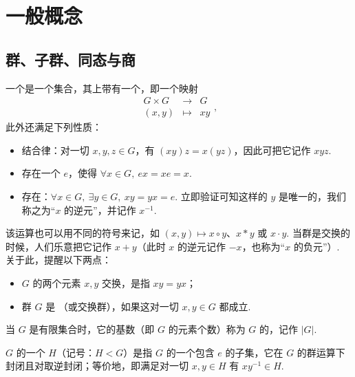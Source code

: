 \chapter{一般概念}\label{chap:fg-1}
\section{群、子群、同态与商}\label{sec:fg-1-1}

\begin{definition}\label{def:fg-1-1-1}
一个是一个集合，其上带有一个，即一个映射
\[
\begin{array}{rcl}
G\times G & \longrightarrow & G\\
(x,y) & \longmapsto & xy
\end{array},
\]
此外还满足下列性质：
\begin{itemize}[label=--]
\item 结合律：对一切 $x,y,z\in G$，有 $(xy)z=x(yz)$，因此可把它记作 $xyz$.
\item 存在一个 $e$，使得 $\forall x\in G,\ ex=xe=x$.
\item 存在：$\forall x\in G,\ \exists y\in G,\ xy=yx=e$. 立即验证可知这样的 $y$ 是唯一的，我们称之为``$x$ 的逆元''，并记作 $x^{-1}$.
\end{itemize}

该运算也可以用不同的符号来记，如 $(x,y)\mapsto x\circ y$、$x*y$ 或 $x\cdot y$. 当群是交换的时候，人们乐意把它记作 $x+y$（此时 $x$ 的逆元记作 $-x$，也称为``$x$ 的负元''）. 关于此，提醒以下两点：
\begin{itemize}[label=--]
\item $G$ 的两个元素 $x,y$ 交换，是指 $xy=yx$；
\item 群 $G$ 是 （或交换群），如果这对一切 $x,y\in G$ 都成立.
\end{itemize}
当 $G$ 是有限集合时，它的基数（即 $G$ 的元素个数）称为 $G$ 的，记作 $|G|$.
\end{definition}

\begin{definition}\label{def:fg-1-1-2}
$G$ 的一个 $H$（记号：$H<G$）是指 $G$ 的一个包含 $e$ 的子集，它在 $G$ 的群运算下封闭且对取逆封闭；等价地，即满足对一切 $x,y\in H$ 有 $xy^{-1}\in H$.
\end{definition}

